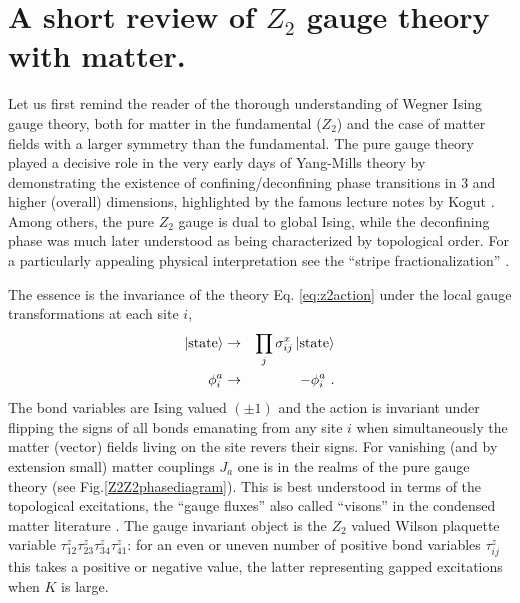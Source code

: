 \section{ A short review of $Z_2$ gauge theory with matter.}
\label{Z2Z2review} 

Let us first remind the reader of the thorough understanding of Wegner Ising gauge theory, both for matter in the fundamental ($Z_2$) and the  case of matter fields with a larger symmetry than the fundamental. The pure gauge theory played a decisive role in the very early days of Yang-Mills theory by demonstrating the existence of confining/deconfining phase transitions \cite{Wegner} in 3 and higher (overall) dimensions, highlighted by the famous lecture notes  by Kogut \cite{Kogut}. Among others, the pure $Z_2$ gauge is dual to global Ising, while the deconfining phase was much later understood as being characterized by topological order. For a particularly appealing physical interpretation see the ``stripe fractionalization'' \cite{stripefrac,stripefracdemler}. 

The essence is the invariance of the theory Eq. \eqref{eq:z2action}  under the local gauge transformations at each site $i$, 
\begin{eqnarray}
	\ket{\text{state}} &\rightarrow  &\prod_j \sigma_{ij}^x \ket{\text{state}} \nonumber \\
	\phi_i^a &\rightarrow  & -\phi_i^a \ .
	\label{gaugetrans}	
\end{eqnarray}
The bond variables are Ising valued $(\pm1)$ and the action is invariant under flipping the signs of all bonds emanating from any site $i$ when simultaneously the matter (vector) fields living on the site revers their signs. For vanishing (and by extension small) matter couplings $J_a$ one is in the realms of the pure gauge theory (see Fig.\ref{Z2Z2phasediagram}). This is best understood in terms of the topological excitations, the ``gauge fluxes'' \cite{Kogut} also called ``visons'' in the condensed matter literature \cite{visons}. The gauge invariant object is the $Z_2$ valued Wilson plaquette variable $\tau^z_{12}\tau^z_{23}\tau^z_{34}\tau^z_{41}$: for an even or uneven number of positive bond variables $\tau^z_{ij}$ this takes a positive or negative value, the latter representing gapped excitations when $K$ is large. 

